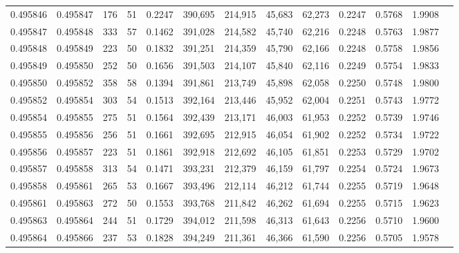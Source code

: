 \begin{tabular}{rrrrrrrrrrrrr}
0.495846 & 0.495847 &   176 &  51 &                                     0.2247 & 390,695 & 214,915 &  45,683 &  62,273 & 0.2247 & 0.5768 & 1.9908 \\
0.495847 & 0.495848 &   333 &  57 &                                     0.1462 & 391,028 & 214,582 &  45,740 &  62,216 & 0.2248 & 0.5763 & 1.9877 \\
0.495848 & 0.495849 &   223 &  50 &                                     0.1832 & 391,251 & 214,359 &  45,790 &  62,166 & 0.2248 & 0.5758 & 1.9856 \\
0.495849 & 0.495850 &   252 &  50 &                                     0.1656 & 391,503 & 214,107 &  45,840 &  62,116 & 0.2249 & 0.5754 & 1.9833 \\
0.495850 & 0.495852 &   358 &  58 &                                     0.1394 & 391,861 & 213,749 &  45,898 &  62,058 & 0.2250 & 0.5748 & 1.9800 \\
0.495852 & 0.495854 &   303 &  54 &                                     0.1513 & 392,164 & 213,446 &  45,952 &  62,004 & 0.2251 & 0.5743 & 1.9772 \\
0.495854 & 0.495855 &   275 &  51 &                                     0.1564 & 392,439 & 213,171 &  46,003 &  61,953 & 0.2252 & 0.5739 & 1.9746 \\
0.495855 & 0.495856 &   256 &  51 &                                     0.1661 & 392,695 & 212,915 &  46,054 &  61,902 & 0.2252 & 0.5734 & 1.9722 \\
0.495856 & 0.495857 &   223 &  51 &                                     0.1861 & 392,918 & 212,692 &  46,105 &  61,851 & 0.2253 & 0.5729 & 1.9702 \\
0.495857 & 0.495858 &   313 &  54 &                                     0.1471 & 393,231 & 212,379 &  46,159 &  61,797 & 0.2254 & 0.5724 & 1.9673 \\
0.495858 & 0.495861 &   265 &  53 &                                     0.1667 & 393,496 & 212,114 &  46,212 &  61,744 & 0.2255 & 0.5719 & 1.9648 \\
0.495861 & 0.495863 &   272 &  50 &                                     0.1553 & 393,768 & 211,842 &  46,262 &  61,694 & 0.2255 & 0.5715 & 1.9623 \\
0.495863 & 0.495864 &   244 &  51 &                                     0.1729 & 394,012 & 211,598 &  46,313 &  61,643 & 0.2256 & 0.5710 & 1.9600 \\
0.495864 & 0.495866 &   237 &  53 &                                     0.1828 & 394,249 & 211,361 &  46,366 &  61,590 & 0.2256 & 0.5705 & 1.9578 \\

\end{tabular}
